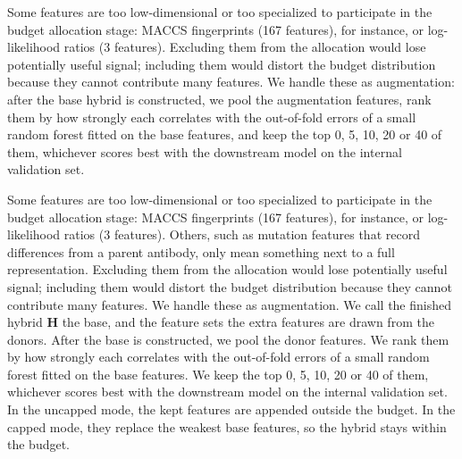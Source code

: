 
Some features are too low-dimensional or too specialized to participate in the budget allocation stage: MACCS fingerprints (167 features), for instance, or log-likelihood ratios (3 features). Excluding them from the allocation would lose potentially useful signal; including them would distort the budget distribution because they cannot contribute many features. We handle these as augmentation: after the base hybrid is constructed, we pool the augmentation features, rank them by how strongly each correlates with the out-of-fold errors of a small random forest fitted on the base features, and keep the top 0, 5, 10, 20 or 40 of them, whichever scores best with the downstream model on the internal validation set.

Some features are too low-dimensional or too specialized to participate in the budget allocation stage: MACCS fingerprints (167 features), for instance, or log-likelihood ratios (3 features). Others, such as mutation features that record differences from a parent antibody, only mean something next to a full representation. Excluding them from the allocation would lose potentially useful signal; including them would distort the budget distribution because they cannot contribute many features. We handle these as augmentation. We call the finished hybrid $\mathbf{H}$ the base, and the feature sets the extra features are drawn from the donors. After the base is constructed, we pool the donor features. We rank them by how strongly each correlates with the out-of-fold errors of a small random forest fitted on the base features. We keep the top 0, 5, 10, 20 or 40 of them, whichever scores best with the downstream model on the internal validation set. In the uncapped mode, the kept features are appended outside the budget. In the capped mode, they replace the weakest base features, so the hybrid stays within the budget.

